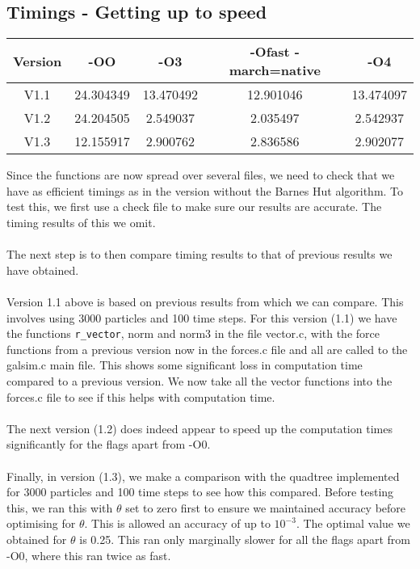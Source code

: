 \documentclass{article}
\begin{document}
\subsection{Timings - Getting up to speed}
\begin{center}
\begin{tabular}{|c|c|c|c|c|}
\hline
Version & -OO & -O3 & -Ofast -march=native & -O4\\
\hline
V1.1 & 24.304349 & 13.470492 & 12.901046 & 13.474097\\
V1.2 & 24.204505 & 2.549037 & 2.035497 & 2.542937\\
V1.3 & 12.155917 & 2.900762 & 2.836586 & 2.902077\\
\hline
\end{tabular}
\end{center}
Since the functions are now spread over several files, we need to check that we have as efficient timings as in the version without the Barnes Hut algorithm. To test this, we first use a check file to make sure our results are accurate. The timing results of this we omit. 
\\\\
The next step is to then compare timing results to that of previous results we have obtained. 
\\\\
Version 1.1 above is based on previous results from which we can compare. This involves using 3000 particles and 100 time steps. For this version (1.1) we have the functions \verb|r_vector|, norm and norm3 in the file vector.c, with the force functions from a previous version now in the forces.c file and all are called to the galsim.c main file. This shows some significant loss in computation time compared to a previous version. We now take all the vector functions into the forces.c file to see if this helps with computation time.
\\\\
The next version (1.2) does indeed appear to speed up the computation times significantly for the flags apart from -O0. 
\\\\
Finally, in version (1.3), we make a comparison with the quadtree implemented for 3000 particles and 100 time steps to see how this compared. Before testing this, we ran this with $\theta$ set to zero first to ensure we maintained accuracy before optimising for $\theta$. This is allowed an accuracy of up to $10^{-3}$. The optimal value we obtained for $\theta$ is 0.25. This ran only marginally slower for all the flags apart from -O0, where this ran twice as fast. 
\end{document}
